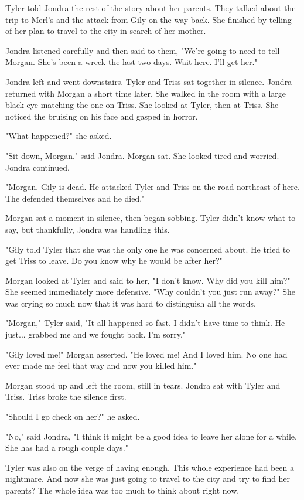 \documentclass[courier]{sffms}
\begin{document}
Tyler told Jondra the rest of the story about her parents.
They talked about the trip to Merl's and the attack from
Gily on the way back. She finished by telling of her plan
to travel to the city in search of her mother.

Jondra listened carefully and then said to them,
"We're going to need to tell Morgan. She's been a wreck
the last two days. Wait here. I'll get her."

Jondra left and went downstairs. Tyler and Triss sat 
together in silence. Jondra returned with Morgan a short
time later. She walked in the room with
a large black eye matching the one on Triss.
She looked at Tyler, then at Triss. She noticed
the bruising on his face and gasped in horror.

"What happened?" she asked.

"Sit down, Morgan." said Jondra. Morgan sat.
She looked tired and worried. Jondra
continued.

"Morgan. Gily is dead. He attacked Tyler and
Triss on the road northeast of here. The
defended themselves and he died."

Morgan sat a moment in silence, then began
sobbing. Tyler didn't know what to say, but
thankfully, Jondra was handling this.

"Gily told Tyler that she was the only one
he was concerned about. He tried to get
Triss to leave. Do you know why he would
be after her?"

Morgan looked at Tyler and said to her,
"I don't know. Why did you kill him?" She
seemed immediately more defensive.
"Why couldn't you just run away?" She was
crying so much now that it was hard to
distinguish all the words.

"Morgan," Tyler said, "It all happened so
fast. I didn't have time to think. He just...
grabbed me and we fought back. I'm
sorry."

"Gily loved me!" Morgan asserted. "He
loved me! And I loved him. No one had
ever made me feel that way and now you
killed him."

Morgan stood up and left the room, still
in tears. Jondra sat with Tyler and Triss.
Triss broke the silence first.

"Should I go check on her?" he asked.

"No," said Jondra, "I think it might be a
good idea to leave her alone for a while.
She has had a rough couple days."

Tyler was also on the verge of having enough.
This whole experience had been a nightmare.
And now she was just going to travel to the
city and try to find her parents? The whole
idea was too much to think about right now.
\end{document}
